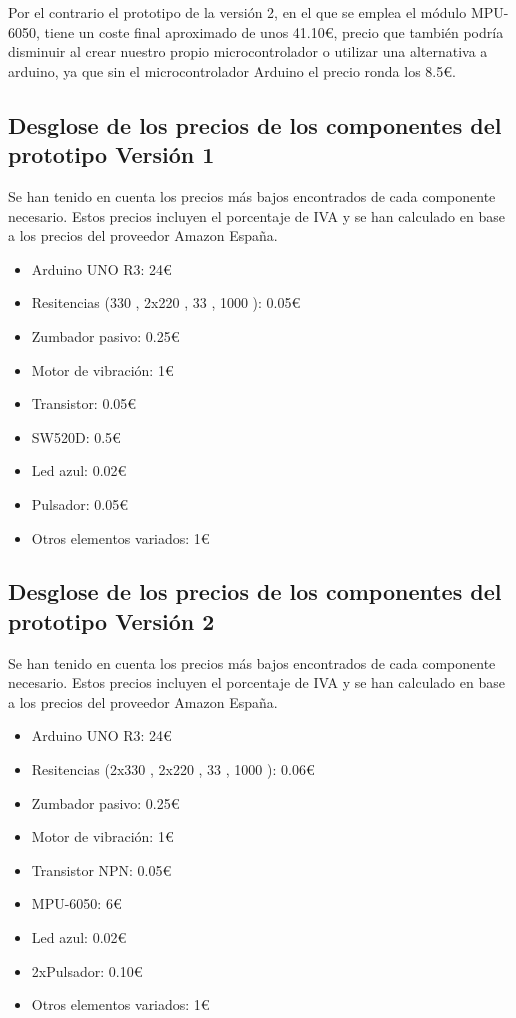 Por el contrario el prototipo de la versión 2, en el que se emplea el módulo MPU-6050\cite{MPU6050_1,MPU6050_2}, tiene un coste final aproximado de unos 41.10€, precio que también podría disminuir al crear nuestro propio microcontrolador o utilizar una alternativa a arduino, ya que sin el microcontrolador Arduino el precio ronda los 8.5€.


\subsection{Desglose de los precios de los componentes del prototipo Versión 1}

Se han tenido en cuenta los precios más bajos encontrados de cada componente necesario. Estos precios incluyen el porcentaje de IVA y se han calculado en base a los precios del proveedor Amazon España\cite{amazon}.
\begin{itemize}
    \item Arduino UNO R3: 24€
    \item Resitencias (330 \textOmega, 2x220 \textOmega, 33 \textOmega, 1000 \textOmega): 0.05€
    \item Zumbador pasivo: 0.25€
    \item Motor de vibración: 1€
    \item Transistor: 0.05€
    \item SW520D: 0.5€
    \item Led azul: 0.02€
    \item Pulsador: 0.05€
    \item Otros elementos variados: 1€
    
\end{itemize}

\subsection{Desglose de los precios de los componentes del prototipo Versión 2}
Se han tenido en cuenta los precios más bajos encontrados de cada componente necesario. Estos precios incluyen el porcentaje de IVA y se han calculado en base a los precios del proveedor Amazon España\cite{amazon}.
\begin{itemize}
    \item Arduino UNO R3: 24€
    \item Resitencias (2x330 \textOmega, 2x220 \textOmega, 33 \textOmega, 1000 \textOmega): 0.06€
    \item Zumbador pasivo: 0.25€
    \item Motor de vibración: 1€
    \item Transistor NPN: 0.05€
    \item MPU-6050: 6€
    \item Led azul: 0.02€
    \item 2xPulsador: 0.10€
    \item Otros elementos variados: 1€
    
\end{itemize}


